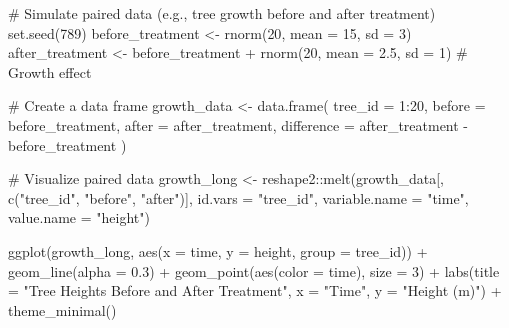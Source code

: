 \documentclass[
  letterpaper,
]{book}
\newenvironment{Shaded}{\begin{snugshade}}{\end{snugshade}}
\newcommand{\AttributeTok}[1]{\textcolor[rgb]{0.40,0.45,0.13}{#1}}
\newcommand{\CommentTok}[1]{\textcolor[rgb]{0.37,0.37,0.37}{#1}}
\newcommand{\DecValTok}[1]{\textcolor[rgb]{0.68,0.00,0.00}{#1}}
\newcommand{\FloatTok}[1]{\textcolor[rgb]{0.68,0.00,0.00}{#1}}
\newcommand{\FunctionTok}[1]{\textcolor[rgb]{0.28,0.35,0.67}{#1}}
\newcommand{\NormalTok}[1]{\textcolor[rgb]{0.00,0.23,0.31}{#1}}
\newcommand{\OtherTok}[1]{\textcolor[rgb]{0.00,0.23,0.31}{#1}}
\newcommand{\SpecialCharTok}[1]{\textcolor[rgb]{0.37,0.37,0.37}{#1}}
\newcommand{\StringTok}[1]{\textcolor[rgb]{0.13,0.47,0.30}{#1}}
\begin{document}
\begin{Shaded}
\begin{Highlighting}[]
\CommentTok{\# Simulate paired data (e.g., tree growth before and after treatment)}
\FunctionTok{set.seed}\NormalTok{(}\DecValTok{789}\NormalTok{)}
\NormalTok{before\_treatment }\OtherTok{\textless{}{-}} \FunctionTok{rnorm}\NormalTok{(}\DecValTok{20}\NormalTok{, }\AttributeTok{mean =} \DecValTok{15}\NormalTok{, }\AttributeTok{sd =} \DecValTok{3}\NormalTok{)}
\NormalTok{after\_treatment }\OtherTok{\textless{}{-}}\NormalTok{ before\_treatment }\SpecialCharTok{+} \FunctionTok{rnorm}\NormalTok{(}\DecValTok{20}\NormalTok{, }\AttributeTok{mean =} \FloatTok{2.5}\NormalTok{, }\AttributeTok{sd =} \DecValTok{1}\NormalTok{)  }\CommentTok{\# Growth effect}

\CommentTok{\# Create a data frame}
\NormalTok{growth\_data }\OtherTok{\textless{}{-}} \FunctionTok{data.frame}\NormalTok{(}
  \AttributeTok{tree\_id =} \DecValTok{1}\SpecialCharTok{:}\DecValTok{20}\NormalTok{,}
  \AttributeTok{before =}\NormalTok{ before\_treatment,}
  \AttributeTok{after =}\NormalTok{ after\_treatment,}
  \AttributeTok{difference =}\NormalTok{ after\_treatment }\SpecialCharTok{{-}}\NormalTok{ before\_treatment}
\NormalTok{)}

\CommentTok{\# Visualize paired data}
\NormalTok{growth\_long }\OtherTok{\textless{}{-}}\NormalTok{ reshape2}\SpecialCharTok{::}\FunctionTok{melt}\NormalTok{(growth\_data[, }\FunctionTok{c}\NormalTok{(}\StringTok{"tree\_id"}\NormalTok{, }\StringTok{"before"}\NormalTok{, }\StringTok{"after"}\NormalTok{)], }
                             \AttributeTok{id.vars =} \StringTok{"tree\_id"}\NormalTok{, }
                             \AttributeTok{variable.name =} \StringTok{"time"}\NormalTok{, }
                             \AttributeTok{value.name =} \StringTok{"height"}\NormalTok{)}

\FunctionTok{ggplot}\NormalTok{(growth\_long, }\FunctionTok{aes}\NormalTok{(}\AttributeTok{x =}\NormalTok{ time, }\AttributeTok{y =}\NormalTok{ height, }\AttributeTok{group =}\NormalTok{ tree\_id)) }\SpecialCharTok{+}
  \FunctionTok{geom\_line}\NormalTok{(}\AttributeTok{alpha =} \FloatTok{0.3}\NormalTok{) }\SpecialCharTok{+}
  \FunctionTok{geom\_point}\NormalTok{(}\FunctionTok{aes}\NormalTok{(}\AttributeTok{color =}\NormalTok{ time), }\AttributeTok{size =} \DecValTok{3}\NormalTok{) }\SpecialCharTok{+}
  \FunctionTok{labs}\NormalTok{(}\AttributeTok{title =} \StringTok{"Tree Heights Before and After Treatment"}\NormalTok{,}
       \AttributeTok{x =} \StringTok{"Time"}\NormalTok{,}
       \AttributeTok{y =} \StringTok{"Height (m)"}\NormalTok{) }\SpecialCharTok{+}
  \FunctionTok{theme\_minimal}\NormalTok{()}
\end{Highlighting}
\end{Shaded}
\end{document}
